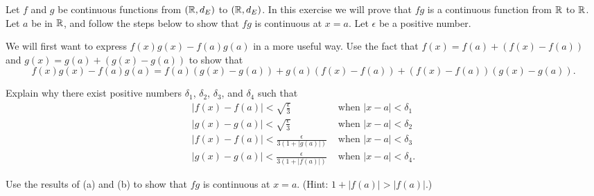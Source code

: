 \item Let $f$ and $g$ be continuous functions from $(\mathbb{R}, d_E)$ to $(\mathbb{R},d_E)$. In this exercise we will prove that $fg$ is a continuous function from $\mathbb{R}$ to $\mathbb{R}$.  Let $a$ be in $\mathbb{R}$, and follow the steps below to show that $fg$ is continuous at $x=a$. Let $\epsilon$ be a positive number.

	\ba
	
	\item We will first want to express $f(x)g(x) - f(a)g(a)$ in a more useful way. Use the fact that $f(x) = f(a) + (f(x)-f(a))$ and $g(x)  = g(a) + (g(x)-g(a))$ to show that 
	\begin{equation*}
	f(x)g(x)-f(a)g(a) = f(a)(g(x)-g(a)) + g(a)(f(x)-f(a)) + (f(x)-f(a))(g(x)-g(a)).
	\end{equation*}
	
	\item Explain why there exist positive numbers $\delta_1$, $\delta_2$, $\delta_3$, and $\delta_4$ such that 
\begin{align*}
|f(x)-f(a)| < \sqrt{\frac{\epsilon}{3}} &\text{ when } |x-a| < \delta_1 \\
|g(x)-g(a)| <  \sqrt{\frac{\epsilon}{3}}  &\text{ when } |x-a| < \delta_2 \\
|f(x)-f(a)| < \frac{\epsilon}{3(1+|g(a)|)}  &\text{ when } |x-a| < \delta_3 \\
|g(x)-g(a)| < \frac{\epsilon}{3(1+|f(a)|)}  &\text{ when } |x-a| < \delta_4.
\end{align*}

	\item Use the results of (a) and (b) to show that $fg$ is continuous at $x=a$. (Hint: $1+|f(a)| > |f(a)|$.)

	
	
	\ea
	
